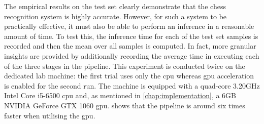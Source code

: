 \documentclass[../report.tex]{subfiles}
\begin{document}
The empirical results on the test set clearly demonstrate that the chess recognition system is highly accurate.
However, for such a system to be practically effective, it must also be able to perform an inference in a reasonable amount of time.
To test this, the inference time for each of the test set samples is recorded and then the mean over all samples is computed.
In fact, more granular insights are provided by additionally recording the average time in executing each of the three stages in the pipeline.
This experiment is conducted twice on the dedicated lab machine: the first trial uses only the \gls{cpu} whereas \gls{gpu} acceleration is enabled for the second run.
The machine is equipped with a quad-core 3.20GHz Intel Core i5-6500 \gls{cpu} and, as mentioned in \cref{chap:implementation}, a 6GB NVIDIA GeForce GTX 1060 \gls{gpu}.
 shows that the pipeline is around six times faster when utilising the \gls{gpu}.
\end{document}
